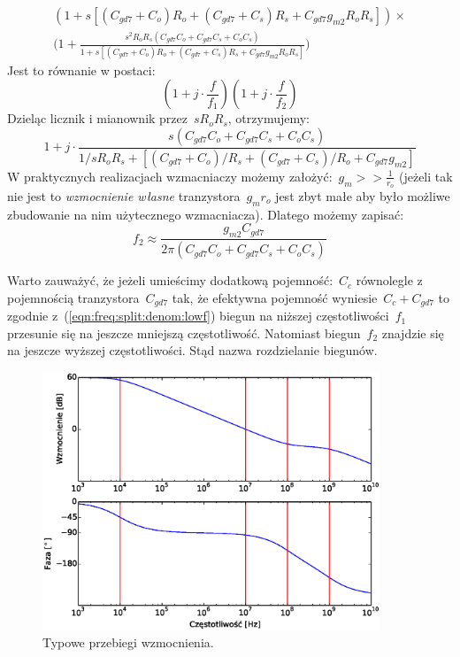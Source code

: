 \documentclass[twoside,pl,final]{labman}
\begin{document}
\begin{align}
  (1 + s[(C_{gd7} + C_o) R_o +
         (C_{gd7} + C_s) R_s +
          C_{gd7} g_{m2} R_o R_s]) \times \nonumber \\
  \Big(1 + \frac{s^2 R_o R_s (C_{gd7} C_o + C_{gd7} C_s + C_o C_s)}
                {1 + s[(C_{gd7} + C_o) R_o +
                       (C_{gd7} + C_s) R_s +
                        C_{gd7} g_{m2} R_o R_s]}\Big)
\end{align}
Jest to równanie w postaci:
\begin{equation}
  (1 + j \cdot \frac{f}{f_1})(1 + j \cdot \frac{f}{f_2})
\end{equation}
Dzieląc licznik i mianownik przez~$s R_o R_s$, otrzymujemy:
\begin{equation}
  1 + j \cdot \frac{s(C_{gd7} C_o + C_{gd7} C_s + C_o C_s)}
    {1 / s R_o R_s + [(C_{gd7} + C_o) / R_s +
                      (C_{gd7} + C_s) / R_o + C_{gd7} g_{m2}]}
\end{equation}
W praktycznych realizacjach wzmacniaczy możemy założyć:~$g_m >> \frac{1}{r_o}$
(jeżeli tak nie jest to \emph{wzmocnienie własne}
tranzystora~$g_m r_o$ jest zbyt małe
aby było możliwe zbudowanie na nim użytecznego wzmacniacza).
Dlatego możemy zapisać:
\begin{equation}
  f_2 \approx \frac{g_{m2} C_{gd7}}{2 \pi (C_{gd7} C_o + C_{gd7} C_s + C_o C_s)}
  \label{eqn:freq:split:denom:highf}
\end{equation}

Warto zauważyć, że jeżeli umieścimy dodatkową pojemność:~$C_c$
równolegle z pojemnością tranzystora~$C_{gd7}$ tak,
że efektywna pojemność wyniesie~$C_c + C_{gd7}$ to
zgodnie z~(\ref{eqn:freq:split:denom:lowf})
biegun na niższej częstotliwości~$f_1$
przesunie się na jeszcze mniejszą częstotliwość.
Natomiast biegun~$f_2$ znajdzie się na jeszcze wyższej częstotliwości.
Stąd nazwa rozdzielanie biegunów.

\begin{figure}[!htbp]
  \centering
  \includegraphics[width=0.9\textwidth]{tf}
  \caption{Typowe przebiegi wzmocnienia.}
  \label{fig:freq:split:tf}
\end{figure}
\end{document}
